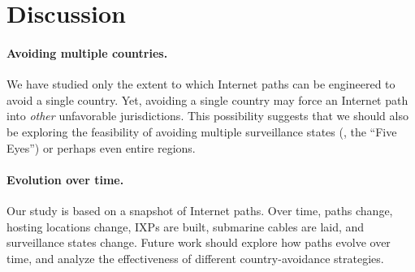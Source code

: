 \section{Discussion}
\label{discussion}

\paragraph{Avoiding multiple countries.} 
We have studied only the extent to which Internet paths can be
engineered to avoid a {single} country.  Yet, avoiding a single country
may force an Internet path into {\em other} unfavorable
jurisdictions. This possibility suggests that we should also be
exploring the feasibility of avoiding multiple surveillance states (\eg,
the ``Five Eyes'') or perhaps even entire regions. 

\paragraph{Evolution over time.}
Our study is based on a snapshot of Internet paths. Over time, paths
change, hosting locations change, IXPs are built, submarine cables are
laid, and surveillance states change.  Future work should explore how
paths evolve over time, and analyze the effectiveness of different
country-avoidance strategies.


